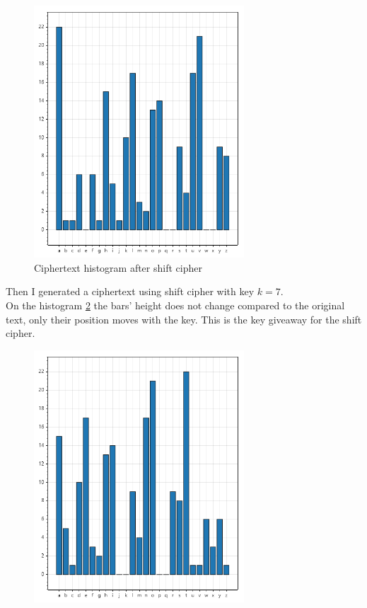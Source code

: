 \documentclass{article}
\begin{document}
\begin{enumerate}[label={}]
\begin{figure}[H]
			\label{fig:originalHist}
		\end{figure}
		\begin{figure}[H]
			\centering
			\includegraphics[width=0.7\textwidth]{shifted.png}
			\caption{Ciphertext histogram after shift cipher}
			\label{fig:shiftedHist}
		\end{figure}
		Then I generated a ciphertext using shift cipher with key $k=7$.\\
		On the histogram \ref{fig:shiftedHist} the bars' height does not change compared to the original text, only their position moves with the key. This is the key giveaway for the shift cipher.
		\begin{figure}[H]
			\centering
			\includegraphics[width=0.7\textwidth]{permuted.png}

\end{figure}
\end{enumerate}
\end{document}
